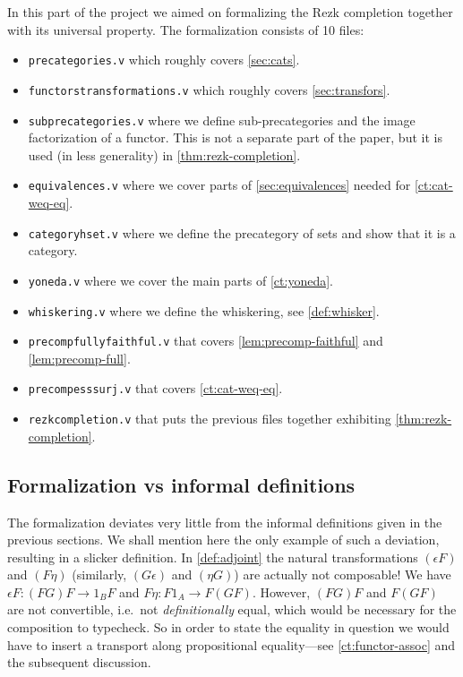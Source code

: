 In this part of the project we aimed on formalizing the Rezk completion together with its universal property. The formalization consists of 10 files:
\begin{itemize}
 \item \texttt{precategories.v} which roughly covers \autoref{sec:cats}.
 \item \texttt{functors\textunderscore transformations.v} which roughly covers \autoref{sec:transfors}.
 \item \texttt{sub\textunderscore precategories.v} where we define sub-precategories and
                 the image factorization of a functor. 
          This is not a separate part of the paper, but it is used (in less generality) in \autoref{thm:rezk-completion}.
 \item \texttt{equivalences.v} where we cover parts of \autoref{sec:equivalences} needed for \autoref{ct:cat-weq-eq}.
 \item \texttt{category\textunderscore hset.v} where we define the precategory of sets and show that it is a category.
 \item \texttt{yoneda.v} where we cover the main parts of \autoref{ct:yoneda}.
 \item \texttt{whiskering.v} where we define the whiskering, see \autoref{def:whisker}.
 \item \texttt{precomp\textunderscore fully\textunderscore faithful.v} that covers \autoref{lem:precomp-faithful} and \ref{lem:precomp-full}.
 \item \texttt{precomp\textunderscore ess\textunderscore surj.v} that covers \autoref{ct:cat-weq-eq}.
 \item \texttt{rezk\textunderscore completion.v} that puts the previous files together exhibiting \autoref{thm:rezk-completion}.
\end{itemize}






\subsection*{Formalization vs informal definitions}

The formalization deviates very little from the informal definitions given in the previous sections.
We shall mention here the only example of such a deviation, resulting in a slicker definition. 
In \autoref{def:adjoint} the natural transformations $(\epsilon F)$ and $(F\eta)$ (similarly, 
$(G\epsilon)$ and $(\eta G)$) are actually not
composable! We have $\epsilon F : (FG)F \to 1_{B}F$ and $F\eta : F1_A \to F(GF)$. 
However, $(FG)F$ and $F(GF)$ are not convertible, i.e.\ not \emph{definitionally} equal, 
which would be necessary for the composition to typecheck. So in order to state the equality in question
we would have to insert a transport along propositional equality---see \autoref{ct:functor-assoc} and the subsequent discussion.

